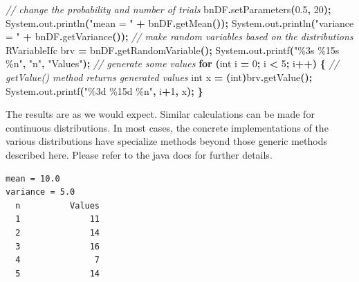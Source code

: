 \documentclass[
]{book}
\newenvironment{Shaded}{\begin{snugshade}}{\end{snugshade}}
\newcommand{\BuiltInTok}[1]{#1}
\newcommand{\CommentTok}[1]{\textcolor[rgb]{0.56,0.35,0.01}{\textit{#1}}}
\newcommand{\ControlFlowTok}[1]{\textcolor[rgb]{0.13,0.29,0.53}{\textbf{#1}}}
\newcommand{\DataTypeTok}[1]{\textcolor[rgb]{0.13,0.29,0.53}{#1}}
\newcommand{\DecValTok}[1]{\textcolor[rgb]{0.00,0.00,0.81}{#1}}
\newcommand{\FloatTok}[1]{\textcolor[rgb]{0.00,0.00,0.81}{#1}}
\newcommand{\FunctionTok}[1]{\textcolor[rgb]{0.00,0.00,0.00}{#1}}
\newcommand{\NormalTok}[1]{#1}
\newcommand{\OperatorTok}[1]{\textcolor[rgb]{0.81,0.36,0.00}{\textbf{#1}}}
\newcommand{\SpecialCharTok}[1]{\textcolor[rgb]{0.00,0.00,0.00}{#1}}
\newcommand{\StringTok}[1]{\textcolor[rgb]{0.31,0.60,0.02}{#1}}
\theoremstyle{definition}
\theoremstyle{definition}
\theoremstyle{definition}
\theoremstyle{definition}
\theoremstyle{remark}
\begin{document}
\begin{Shaded}
\begin{Highlighting}[]
\CommentTok{// change the probability and number of trials}
\NormalTok{bnDF}\OperatorTok{.}\FunctionTok{setParameters}\OperatorTok{(}\FloatTok{0.5}\OperatorTok{,} \DecValTok{20}\OperatorTok{);}
\BuiltInTok{System}\OperatorTok{.}\FunctionTok{out}\OperatorTok{.}\FunctionTok{println}\OperatorTok{(}\StringTok{"mean = "} \OperatorTok{+}\NormalTok{ bnDF}\OperatorTok{.}\FunctionTok{getMean}\OperatorTok{());}
\BuiltInTok{System}\OperatorTok{.}\FunctionTok{out}\OperatorTok{.}\FunctionTok{println}\OperatorTok{(}\StringTok{"variance = "} \OperatorTok{+}\NormalTok{ bnDF}\OperatorTok{.}\FunctionTok{getVariance}\OperatorTok{());}
\CommentTok{// make random variables based on the distributions}
\NormalTok{RVariableIfc brv }\OperatorTok{=}\NormalTok{ bnDF}\OperatorTok{.}\FunctionTok{getRandomVariable}\OperatorTok{();}
\BuiltInTok{System}\OperatorTok{.}\FunctionTok{out}\OperatorTok{.}\FunctionTok{printf}\OperatorTok{(}\StringTok{"}\SpecialCharTok{\%3s}\StringTok{ }\SpecialCharTok{\%15s}\StringTok{ }\SpecialCharTok{\%n}\StringTok{"}\OperatorTok{,} \StringTok{"n"}\OperatorTok{,} \StringTok{"Values"}\OperatorTok{);}
\CommentTok{// generate some values}
\ControlFlowTok{for} \OperatorTok{(}\DataTypeTok{int}\NormalTok{ i }\OperatorTok{=} \DecValTok{0}\OperatorTok{;}\NormalTok{ i }\OperatorTok{\textless{}} \DecValTok{5}\OperatorTok{;}\NormalTok{ i}\OperatorTok{++)} \OperatorTok{\{}
    \CommentTok{// getValue() method returns generated values}
    \DataTypeTok{int}\NormalTok{ x }\OperatorTok{=} \OperatorTok{(}\DataTypeTok{int}\OperatorTok{)}\NormalTok{brv}\OperatorTok{.}\FunctionTok{getValue}\OperatorTok{();}
    \BuiltInTok{System}\OperatorTok{.}\FunctionTok{out}\OperatorTok{.}\FunctionTok{printf}\OperatorTok{(}\StringTok{"}\SpecialCharTok{\%3d}\StringTok{ }\SpecialCharTok{\%15d}\StringTok{ }\SpecialCharTok{\%n}\StringTok{"}\OperatorTok{,}\NormalTok{ i}\OperatorTok{+}\DecValTok{1}\OperatorTok{,}\NormalTok{ x}\OperatorTok{);}
\OperatorTok{\}}
\end{Highlighting}
\end{Shaded}

The results are as we would expect. Similar calculations can be made for continuous distributions. In most cases, the concrete implementations of the various distributions have specialize methods beyond those generic methods described here. Please refer to the java docs for further details.

\begin{verbatim}
mean = 10.0
variance = 5.0
  n          Values 
  1              11 
  2              14 
  3              16 
  4               7 
  5              14 
\end{verbatim}
\end{document}
